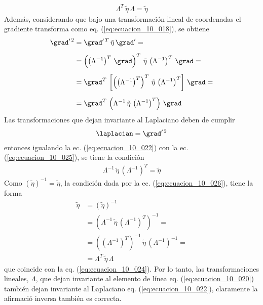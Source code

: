 \begin{align}
\Lambda^{T} \, \tilde{\eta} \, \Lambda = \tilde{\eta}
\label{eq:ecuacion_10_024}
\end{align}
Además, considerando que bajo una transformación lineal de coordenadas el gradiente transforma como eq. (\ref{eq:ecuacion_10_018}), se obtiene
\begin{align}
\grad^{\prime \, 2} &= \grad^{\prime \, T} \, \tilde{\eta} \, \grad^{\prime} = \nonumber \\[0.5em]
&= \left( \left(\Lambda^{-1} \right)^{T} \, \grad \right)^{T} \, \tilde{\eta} \, \left( \Lambda^{-1} \right)^{T} \, \grad = \nonumber \\[0.5em]
&= \grad^{T} \, \left[ \left( \left( \Lambda^{-1} \right)^{T} \right)^{T} \, \tilde{\eta} \, \left( \Lambda^{-1} \right)^{T} \right] \, \grad = \nonumber \\[0.5em]
&= \grad^{T} \, \left( \Lambda^{-1} \, \tilde{\eta} \, \left( \Lambda^{-1} \right)^{T} \right) \, \grad
\label{eq:ecuacion_10_025}
\end{align}
Las transformaciones que dejan invariante al Laplaciano deben de cumplir
\begin{align*}
\laplacian = \grad^{\prime \, 2}
\end{align*}
entonces igualando la ec. (\ref{eq:ecuacion_10_022}) con la ec. (\ref{eq:ecuacion_10_025}), se tiene la condición
\begin{align}
\Lambda^{-1} \, \tilde{\eta} \, \left( \Lambda^{-1} \right)^{T} = \tilde{\eta}
\label{eq:ecuacion_10_026}
\end{align}
Como $(\tilde{\eta})^{-1} = \tilde{\eta}$, la condición dada por la ec. (\ref{eq:ecuacion_10_026}), tiene la forma
\begin{align}
\tilde{\eta} &= \left(\tilde{\eta} \right)^{-1} \nonumber \\[0.5em]
&= \left( \Lambda^{-1} \, \tilde{\eta} \, \left( \Lambda^{-1} \right)^{T} \right)^{-1} = \nonumber \\[0.5em]
&= \left( \left( \Lambda^{-1} \right)^{T} \right)^{-1} \, \tilde{\eta} \, \left( \Lambda^{-1} \right)^{-1} = \nonumber \\[0.5em]
&= \Lambda^{T} \, \tilde{\eta} \, \Lambda
\label{eq:ecuacion_10_027}
\end{align}
que coincide con la eq. (\ref{eq:ecuacion_10_024}). Por lo tanto, las transformaciones lineales, $\Lambda$, que
dejan invariante al elemento de línea eq. (\ref{eq:ecuacion_10_020}) también dejan invariante al
Laplaciano eq. (\ref{eq:ecuacion_10_022}), claramente la afirmació inversa también es correcta.

